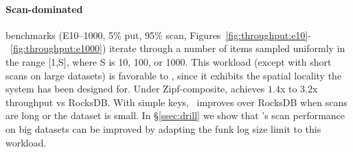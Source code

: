 \paragraph{ Scan-dominated} benchmarks (E10--1000,  5\% put, 95\% scan, Figures~\ref{fig:throughput:e10}-~\ref{fig:throughput:e1000})
iterate through a number of items 
sampled uniformly in the range [1,S], where S is  10, 100, or 1000. 
This workload (except with short scans on  large datasets) is favorable to \sys, 
since it exhibits the spatial locality the system has been designed for. 
Under Zipf-composite, \sys\/ achieves $1.4$x to $3.2$x throughput vs RocksDB.   
With simple keys, \sys\ improves over RocksDB when scans are long or the dataset is small. 
In \S\ref{ssec:drill} we show that \sys's scan performance on big datasets can be improved by adapting the 
funk log size limit to this workload. 
 

